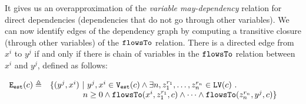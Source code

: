It gives us an overapproximation of the \emph{variable may-dependency} relation for direct dependencies (dependencies that do not go through other variables).
%
%
We can now identify edges of the dependency graph by computing a transitive closure (through other variables) of the  
 $\mathtt{flowsTo}$ relation. There is a directed edge from  $x^i$ to $y^j$ if and only if there is chain of variables 
    in the $\mathtt{flowsTo}$ relation between $x^i$ and $y^j$, defined as follows:
   \begin{center}
$
\begin{array}{cl}
    \mathtt{{E_{est}}}(c) \triangleq &
    \{ 
    (y^j, x^i)  ~ \vert ~ y^j, x^i \in \mathtt{{V_{est}}}(c)
    \land
      \exists n, z_1^{r_1}, \ldots, z_n^{r_n} \in \mathtt{LV}(c) ~.~ 
    \\ 
    & \qquad \qquad
      n \geq 0 \land
      \mathtt{flowsTo}(x^i,  z_1^{r_1}, c) 
      \land \cdots \land \mathtt{flowsTo}(z_n^{r_n}, y^j, c) 
    \}
    \end{array}
$
\end{center}    
